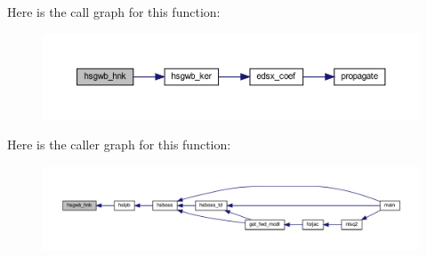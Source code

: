 Here is the call graph for this function\+:\nopagebreak
\begin{figure}[H]
\begin{center}
\leavevmode
\includegraphics[width=350pt]{Leroi_8f90_a8e78b7efe3dc41645eaf9123100f4fc1_cgraph}
\end{center}
\end{figure}
Here is the caller graph for this function\+:\nopagebreak
\begin{figure}[H]
\begin{center}
\leavevmode
\includegraphics[width=350pt]{Leroi_8f90_a8e78b7efe3dc41645eaf9123100f4fc1_icgraph}
\end{center}
\end{figure}
\mbox{\label{Leroi_8f90_ad4730d65d0e42fe38f0f174339af3c71}} 
